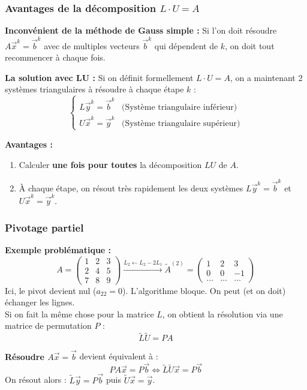 \subsubsection{Avantages de la décomposition $L \cdot U = A$}

\textbf{Inconvénient de la méthode de Gauss simple :} Si l'on doit résoudre $A\vec{x}^k = \vec{b}^k$ avec de multiples vecteurs $\vec{b}^k$ qui dépendent de $k$, on doit tout recommencer à chaque fois.

\textbf{La solution avec LU :} Si on définit formellement $L \cdot U = A$, on a maintenant 2 systèmes triangulaires à résoudre à chaque étape $k$ :
\[
\begin{cases}
L\vec{y}^k = \vec{b}^k & \text{(Système triangulaire inférieur)} \\
U\vec{x}^k = \vec{y}^k & \text{(Système triangulaire supérieur)}
\end{cases}
\]

\textbf{Avantages :}
\begin{enumerate}
    \item Calculer \textbf{une fois pour toutes} la décomposition $LU$ de $A$.
    \item À chaque étape, on résout très rapidement les deux systèmes $L\vec{y}^k = \vec{b}^k$ et $U\vec{x}^k = \vec{y}^k$.
\end{enumerate}

\subsubsection{Pivotage partiel}

\textbf{Exemple problématique :}
\[ 
A = \begin{pmatrix} 1 & 2 & 3 \\ 2 & 4 & 5 \\ 7 & 8 & 9 \end{pmatrix} \xrightarrow{L_2 \leftarrow L_2 - 2L_1} \tilde{A}^{(2)} = \begin{pmatrix} 1 & 2 & 3 \\ 0 & 0 & -1 \\ \dots & \dots & \dots \end{pmatrix}
\]
Ici, le pivot devient nul ($a_{22} = 0$). L'algorithme bloque. On peut (et on doit) échanger les lignes. \\
Si on fait la même chose pour la matrice $L$, on obtient la résolution via une matrice de permutation $P$ :
\[ \tilde{L}\tilde{U} = PA \]

\textbf{Résoudre $A\vec{x} = \vec{b}$} devient équivalent à :
\[ PA\vec{x} = P\vec{b} \iff \tilde{L}\tilde{U}\vec{x} = P\vec{b} \]
On résout alors : $\tilde{L}\vec{y} = P\vec{b}$ puis $\tilde{U}\vec{x} = \vec{y}$.

